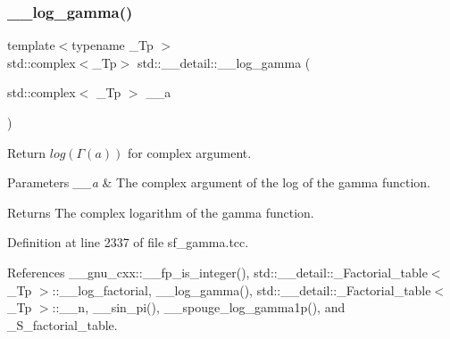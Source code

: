 \mbox{\label{namespacestd_1_1____detail_ad37ad67a4b856eb97b13c8844f9ef8d8}} 
\subsubsection{\texorpdfstring{\+\_\+\+\_\+log\+\_\+gamma()}{\_\_log\_gamma()}\hspace{0.1cm}{\footnotesize\ttfamily [2/2]}}
{\footnotesize\ttfamily template$<$typename \+\_\+\+Tp $>$ \\
std\+::complex$<$\+\_\+\+Tp$>$ std\+::\+\_\+\+\_\+detail\+::\+\_\+\+\_\+log\+\_\+gamma (\begin{DoxyParamCaption}\item[{std\+::complex$<$ \+\_\+\+Tp $>$}]{\+\_\+\+\_\+a }\end{DoxyParamCaption})}



Return $ log(\Gamma(a)) $ for complex argument. 


\begin{DoxyParams}{Parameters}
{\em \+\_\+\+\_\+a} & The complex argument of the log of the gamma function. \\
\hline
\end{DoxyParams}
\begin{DoxyReturn}{Returns}
The complex logarithm of the gamma function. 
\end{DoxyReturn}


Definition at line 2337 of file sf\+\_\+gamma.\+tcc.



References \+\_\+\+\_\+gnu\+\_\+cxx\+::\+\_\+\+\_\+fp\+\_\+is\+\_\+integer(), std\+::\+\_\+\+\_\+detail\+::\+\_\+\+Factorial\+\_\+table$<$ \+\_\+\+Tp $>$\+::\+\_\+\+\_\+log\+\_\+factorial, \+\_\+\+\_\+log\+\_\+gamma(), std\+::\+\_\+\+\_\+detail\+::\+\_\+\+Factorial\+\_\+table$<$ \+\_\+\+Tp $>$\+::\+\_\+\+\_\+n, \+\_\+\+\_\+sin\+\_\+pi(), \+\_\+\+\_\+spouge\+\_\+log\+\_\+gamma1p(), and \+\_\+\+S\+\_\+factorial\+\_\+table.

\mbox{\label{namespacestd_1_1____detail_ac13e31ebcd3c99d6a7cad9010e039315}} 
